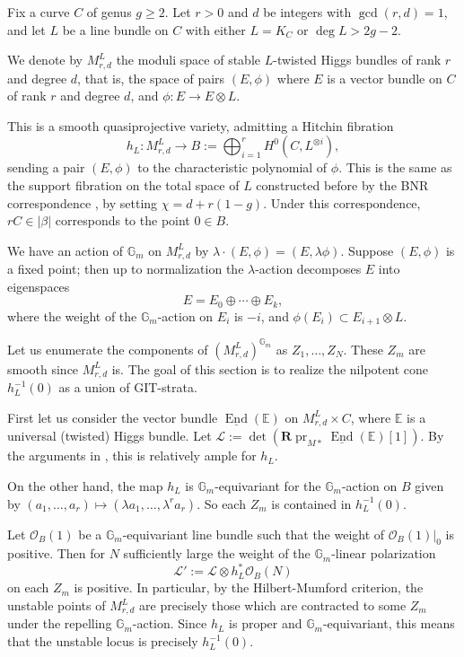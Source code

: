 \documentclass{amsart}
\theoremstyle{plain}
\theoremstyle{definition}
\theoremstyle{remark}
\begin{document}
Fix a curve $C$ of genus $g\ge 2$.
Let $r>0$ and $d$ be integers with $\gcd(r,d)=1$, and let $L$ be a line bundle on $C$ with either $L=K_C$ or $\deg L >2g-2$.

We denote by $M_{r,d}^L$ the moduli space of stable $L$-twisted Higgs bundles of rank $r$ and degree $d$, that is, the space of pairs $(E,\phi)$ where $E$ is a vector bundle on $C$ of rank $r$ and degree $d$, and $\phi:E\to E\otimes L$.

This is a smooth quasiprojective variety, admitting a Hitchin fibration
\[h_L: M_{r,d}^L \rightarrow B:= \bigoplus_{i=1}^r H^0(C, L^{\otimes i}),\]
sending a pair $(E,\phi)$ to the characteristic polynomial of $\phi$.
This is the same as the support fibration on the total space of $L$ constructed before by the BNR correspondence \cite{bnr}, by setting $\chi=d+r(1-g)$.
Under this correspondence, $rC\in |\beta|$ corresponds to the point $0\in B$.

We have an action of $\mathbb{G}_m$ on $M_{r,d}^L$ by $\lambda\cdot(E, \phi)= (E,\lambda\phi)$.
Suppose $(E,\phi)$ is a fixed point; then up to normalization the $\lambda$-action decomposes $E$ into eigenspaces
\[E = E_0 \oplus\cdots\oplus E_k,\]
where the weight of the $\mathbb{G}_m$-action on $E_i$ is $-i$, and $\phi(E_i)\subset E_{i+1}\otimes L$.

Let us enumerate the components of $(M_{r,d}^L)^{\mathbb{G}_m}$ as $Z_1, \dots, Z_N$.
These $Z_m$ are smooth since $M_{r,d}^L$ is.
The goal of this section is to realize the nilpotent cone $h_L^{-1}(0)$ as a union of GIT-strata. 

First let us consider the vector bundle $\underline{\operatorname{End}}(\mathbb{E})$ on $M_{r,d}^L\times C$, where $\mathbb{E}$ is a universal (twisted) Higgs bundle.
Let $\mathcal L:= \det(\mathbf R\operatorname{pr}_{M\ast}\underline{\operatorname{End}}(\mathbb{E})[1])$.
By the arguments in \cite{Nisture}, this is relatively ample for $h_L$.

On the other hand, the map $h_L$ is $\mathbb{G}_m$-equivariant for the $\mathbb{G}_m$-action on $B$ given by $(a_1,\ldots,a_r)\mapsto (\lambda a_1,\ldots,\lambda^r a_r)$.
So each $Z_m$ is contained in $h_L^{-1}(0)$.

Let $\mathcal O_B(1)$ be a $\mathbb{G}_m$-equivariant line bundle such that the weight of $\mathcal O_B(1)|_0$ is positive.
Then for $N$ sufficiently large the weight of the $\mathbb{G}_m$-linear polarization
\[\mathcal L' := \mathcal L\otimes h_L^\ast\mathcal O_B(N)\]
on each $Z_m$ is positive.
In particular, by the Hilbert-Mumford criterion, the unstable points of $M_{r,d}^L$ are precisely those which are contracted to some $Z_m$ under the repelling $\mathbb{G}_m$-action.
Since $h_L$ is proper and $\mathbb{G}_m$-equivariant, this means that the unstable locus is precisely $h_L^{-1}(0)$. 
\end{document}
